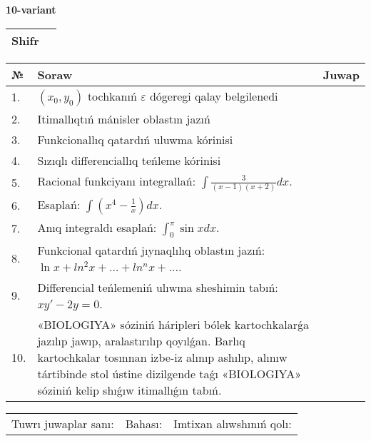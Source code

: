 \documentclass{article}
\begin{document}
  \egroup
  
  \newpage
  
  
  \textbf{10-variant}\\
  
  \bgroup
  \def\arraystretch{1.6} %
  
  \begin{tabular}{|m{5.7cm}|m{9.5cm}|}
  \hline
  Shifr & \\
  \hline
  \end{tabular}
  
  \vspace{1cm}
  
  \begin{tabular}{|m{0.7cm}|m{10cm}|m{4cm}|}
  \hline
  № & Soraw & Juwap \\
  \hline
  1. & \((x_0,y_0)\) tochkanıń \(\varepsilon\) dógeregi qalay belgilenedi &  \\
  \hline
  2. & Itimallıqtıń mánisler oblastın jazıń &  \\
  \hline
  3. & Funkcionallıq qatardıń uluwma kórinisi &  \\
  \hline
  4. & Sızıqlı differenciallıq teńleme kórinisi &  \\
  \hline
  5. & Racional funkciyanı integrallań: \(\int{\frac{3}{(x - 1)(x + 2)}dx}\). &  \\
  \hline
  6. & Esaplań: \(\int\left( x^{4} - \frac{1}{x} \right)dx\). &  \\
  \hline
  7. & Anıq integraldı esaplań: \(\int_{0}^{\pi}{\sin xdx}\). &  \\
  \hline
  8. & Funkcional qatardıń jıynaqlılıq oblastın jazıń: \(\ln x + ln^2 x + ... + ln^{n}x + ...\). &  \\
  \hline
  9. & Differencial teńlemeniń ulıwma sheshimin tabıń: \(xy' - 2y = 0\). &  \\
  \hline
  10. & «BIOLOGIYA» sóziniń háripleri bólek kartochkalarǵa jazılıp jawıp, aralastırılıp qoyılǵan. Barlıq kartochkalar tosınnan izbe-iz alınıp ashılıp, alınıw tártibinde stol ústine dizilgende taǵı «BIOLOGIYA» sóziniń kelip shıǵıw itimallıǵın tabıń. &  \\
  \hline
  \end{tabular}
  
  \vspace{1cm}
  
  \begin{tabular}{lll}
  Tuwrı juwaplar sanı: \underline{\hspace{1.5cm}} & 
  Bahası: \underline{\hspace{1.5cm}} & 
  Imtixan alıwshınıń qolı: \underline{\hspace{2cm}} \\
  \end{tabular}
  
\end{document}
